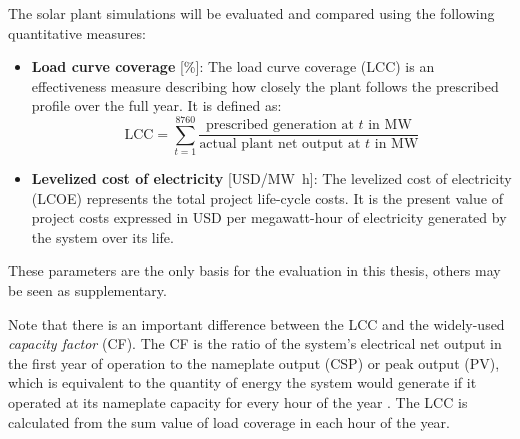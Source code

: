 
The solar plant simulations will be evaluated and compared using the following quantitative measures:
\begin{itemize}
\item \textbf{Load curve coverage} [\si{\percent}]: The load curve coverage (LCC) is an effectiveness measure describing how closely the plant follows the prescribed profile over the full year. It is defined as:
\begin{equation}
\mbox{LCC} = \sum\limits_{t=1}^{8760} \frac{\mbox{prescribed generation at }t\mbox{ in MW}}{\mbox{actual plant net output at }t\mbox{ in MW}} \label{GL_GCC}
\end{equation} 
\item \textbf{Levelized cost of electricity} [USD/\si{\mega\watt\hour}]: The levelized cost of electricity (LCOE) represents the total project life-cycle costs. It is the present value of project costs expressed in USD per megawatt-hour of electricity generated by the system over its life.
\end{itemize}

These parameters are the only basis for the evaluation in this thesis, others may be seen as supplementary. 


Note that there is an important difference between the LCC and the widely-used \emph{capacity factor} (CF). The CF is the ratio of the system's electrical net output in the first year of operation to the nameplate output (CSP) or peak output (PV), which is equivalent to the quantity of energy the system would generate if it operated at its nameplate capacity for every hour of the year \cite{NREL2015a}. The LCC is calculated from the sum value of load coverage in each hour of the year. 


\pagebreak 